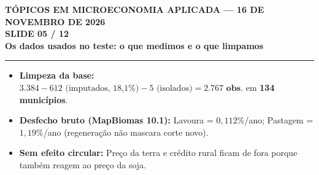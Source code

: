\documentclass[11pt,a4paper]{article}
\newcommand{\slidenum}{1}
\begin{document}
\newpage

\renewcommand{\slidenum}{5}
\noindent
\begin{minipage}{\textwidth}
\begin{center}
{\color{cinza}\footnotesize\textbf{TÓPICOS EM MICROECONOMIA APLICADA --- 16 DE NOVEMBRO DE 2026}\\[1.2mm]}
{\color{cinza}\bfseries\Large SLIDE 05 / 12\\[1.5mm]}
{\color{verde}\bfseries\LARGE Os dados usados no teste: o que medimos e o que limpamos\\[2.5mm]}
\rule{\textwidth}{1pt}
\end{center}
\end{minipage}
\vspace{1.5mm}

\begin{tcolorbox}[title={\bfseries\small ÂNCORAS DO SLIDE}]
\begin{itemize}[leftmargin=*,itemsep=1mm,topsep=0.5mm]
    \item \textbf{Limpeza da base:} $3.384 - 612\text{ (imputados, 18,1\%)} - 5\text{ (isolados)} = \mathbf{2.767\text{ obs.}}$ em \textbf{134 municípios}.
    \item \textbf{Desfecho bruto (MapBiomas 10.1):} Lavoura = $0{,}112\%$/ano; Pastagem = $1{,}19\%$/ano (regeneração não mascara corte novo).
    \item \textbf{Sem efeito circular:} Preço da terra e crédito rural ficam de fora porque também reagem ao preço da soja.
\end{itemize}
\end{tcolorbox}
\vspace{2mm}
\end{document}

